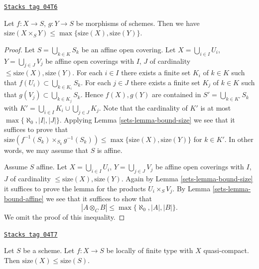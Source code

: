 \begin{lemma}
\label{sets-lemma-bound-size-fibre-product}
\href{https://stacks.math.columbia.edu/tag/04T6}{\texttt{Stacks tag 04T6}}

Let $f : X \to S$, $g : Y \to S$ be morphisms of schemes.
Then we have
$\text{size}(X \times_S Y) \leq \max\{\text{size}(X), \text{size}(Y)\}$.
\end{lemma}

\begin{proof}

Let $S = \bigcup_{k \in K} S_k$ be an affine open covering.
Let $X = \bigcup_{i \in I} U_i$, $Y = \bigcup_{j \in J} V_j$
be affine open coverings with $I$, $J$ of cardinality
$\leq \text{size}(X), \text{size}(Y)$.
For each $i \in I$ there exists a finite set $K_i$ of $k \in K$
such that $f(U_i) \subset \bigcup_{k \in K_i} S_k$.
For each $j \in J$ there exists a finite set $K_j$ of $k \in K$
such that $g(V_j) \subset \bigcup_{k \in K_j} S_k$.
Hence $f(X), g(Y)$ are contained in
$S' = \bigcup_{k \in K'} S_k$ with
$K' = \bigcup_{i \in I} K_i \cup \bigcup_{j \in J} K_j$.
Note that the cardinality of $K'$
is at most $\max\{\aleph_0, |I|, |J|\}$. Applying
Lemma \ref{sets-lemma-bound-size}
we see that it suffices to prove that
$\text{size}(f^{-1}(S_k) \times_{S_k} g^{-1}(S_k))
\leq \max\{\text{size}(X), \text{size}(Y)\}$ for $k \in K'$.
In other words, we may assume that $S$ is affine.

\medskip\noindent
Assume $S$ affine.
Let $X = \bigcup_{i \in I} U_i$, $Y = \bigcup_{j \in J} V_j$
be affine open coverings with $I$, $J$ of cardinality
$\leq \text{size}(X), \text{size}(Y)$.
Again by
Lemma \ref{sets-lemma-bound-size}
it suffices to prove the lemma for the products
$U_i \times_S V_j$. By
Lemma \ref{sets-lemma-bound-affine}
we see that it suffices to show that
$$
|A \otimes_C B| \leq \max\{\aleph_0, |A|, |B|\}.
$$
We omit the proof of this inequality.
\end{proof}

\begin{lemma}
\label{sets-lemma-bound-finite-type}
\href{https://stacks.math.columbia.edu/tag/04T7}{\texttt{Stacks tag 04T7}}

Let $S$ be a scheme.
Let $f : X \to S$ be locally of finite type with $X$ quasi-compact.
Then $\text{size}(X) \leq \text{size}(S)$.
\end{lemma}

